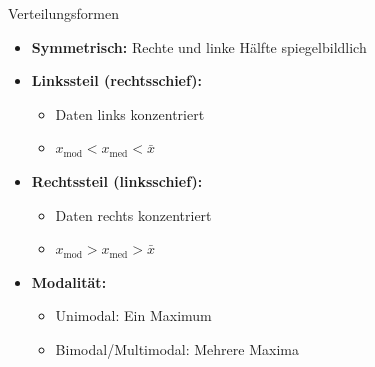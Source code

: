 \begin{concept}{Verteilungsformen}
\begin{itemize}
    \item \textbf{Symmetrisch:} Rechte und linke Hälfte spiegelbildlich
    \item \textbf{Linkssteil (rechtsschief):}
    \begin{itemize}
        \item Daten links konzentriert
        \item $x_{\text{mod}} < x_{\text{med}} < \bar{x}$
    \end{itemize}
    \item \textbf{Rechtssteil (linksschief):}
    \begin{itemize}
        \item Daten rechts konzentriert
        \item $x_{\text{mod}} > x_{\text{med}} > \bar{x}$
    \end{itemize}
    \item \textbf{Modalität:}
    \begin{itemize}
        \item Unimodal: Ein Maximum
        \item Bimodal/Multimodal: Mehrere Maxima
    \end{itemize}
\end{itemize}
\end{concept}